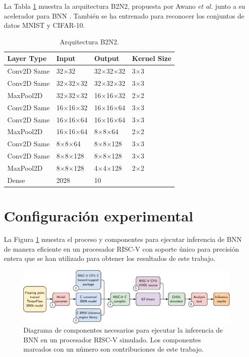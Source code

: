 La Tabla \ref{tab:b2n2_model} muestra la arquitectura B2N2, propuesta por Awano \emph{et al.} junto a su acelerador para BNN \cite{bnn_clt_approx}. También se ha entrenado para reconocer los conjuntos de datos MNIST y CIFAR-10.

\begin{table}[h]
	\centering
	\caption{Arquitectura B2N2.}
	\label{tab:b2n2_model}
	\begin{tabular}{llll}
	\hline
	\textbf{Layer Type} & \textbf{Input} & \textbf{Output} & \textbf{Kernel Size}\\ \hline
	Conv2D Same & 32$\times$32 & 32$\times$32$\times$32 & 3$\times$3 \\
	Conv2D Same & 32$\times$32$\times$32 & 32$\times$32$\times$32 & 3$\times$3 \\
	MaxPool2D & 32$\times$32$\times$32 & 16$\times$16$\times$32 & 2$\times$2 \\
	Conv2D Same & 16$\times$16$\times$32 & 16$\times$16$\times$64 & 3$\times$3 \\
	Conv2D Same & 16$\times$16$\times$64 & 16$\times$16$\times$64 & 3$\times$3 \\
	MaxPool2D & 16$\times$16$\times$64 & 8$\times$8$\times$64 & 2$\times$2 \\
	Conv2D Same & 8$\times$8$\times$64 & 8$\times$8$\times$128 & 3$\times$3 \\
	Conv2D Same & 8$\times$8$\times$128 & 8$\times$8$\times$128 & 3$\times$3 \\
	MaxPool2D & 8$\times$8$\times$128 & 4$\times$4$\times$128 & 2$\times$2 \\
	Dense & 2028 & 10 & \\ \hline
	\end{tabular}
\end{table}

\section{Configuración experimental}

La Figura \ref{fig:experiment_pipeline} muestra el proceso y componentes para ejecutar inferencia de BNN de manera eficiente en un procesador RISC-V con soporte único para precisión entera que se han utilizado para obtener los resultados de este trabajo.

\begin{figure}[h]
	\centering
	\includegraphics[width=\textwidth]{root/Imagenes/4_bnn_riscv/experiment_pipeline.pdf}
	\caption{Diagrama de componentes necesarios para ejecutar la inferencia de BNN en un procesador RISC-V simulado. Los componentes marcados con un número son contribuciones de este trabajo.}
	\label{fig:experiment_pipeline}
\end{figure}

